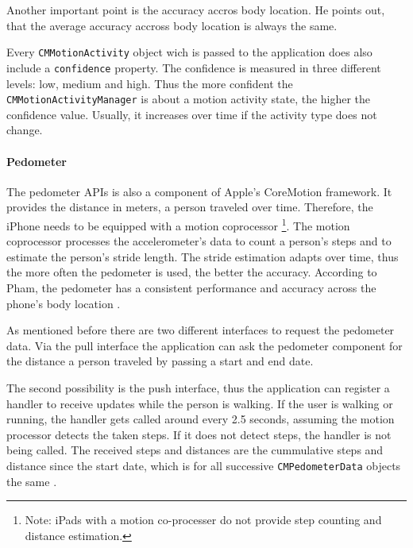 Another important point is the accuracy accros body location.
He points out, that the average accuracy accross body location is always the same.

Every \texttt{CMMotionActivity} object wich is passed to the application does also include a \texttt{confidence} property.
The confidence is measured in three different levels: low, medium and high.
Thus the more confident the \texttt{CMMotionActivityManager} is about a motion activity state, the higher the confidence value.
Usually, it increases over time if the activity type does not change.


\paragraph{Pedometer}

The pedometer \acsp{API} is also a component of Apple's CoreMotion framework.
It provides the distance in meters, a person traveled over time.
Therefore, the iPhone needs to be equipped with a motion coprocessor \footnote{Note: iPads with a motion co-processer do not provide step counting and distance estimation.}.
The motion coprocessor processes the accelerometer's data to count a person's steps and to estimate the person's stride length.
The stride estimation adapts over time, thus the more often the pedometer is used, the better the accuracy.
According to Pham, the pedometer has a consistent performance and accuracy across the phone's body location \cite{wwdc_2014}.

As mentioned before there are two different interfaces to request the pedometer data.
Via the pull interface the application can ask the pedometer component for the distance a person traveled by passing a start and end date.

The second possibility is the push interface, thus the application can register a handler to receive updates while the person is walking.
If the user is walking or running, the handler gets called around every 2.5 seconds, assuming the motion processor detects the taken steps.
If it does not detect steps, the handler is not being called.
The received steps and distances are the cummulative steps and distance since the start date, which is for all successive \texttt{CMPedometerData} objects the same \cite{wwdc_2014}.

